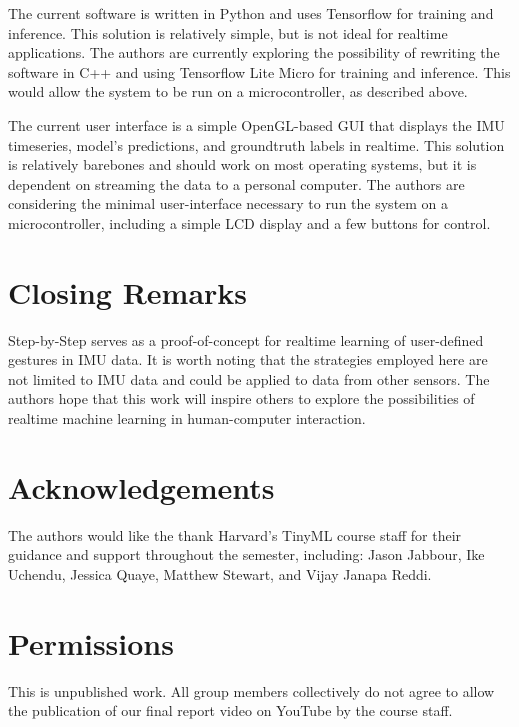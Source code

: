 \documentclass{article}
\begin{document}
The current software is written in Python and uses Tensorflow for training and inference. This solution is relatively simple, but is not ideal for realtime applications. The authors are currently exploring the possibility of rewriting the software in C++ and using Tensorflow Lite Micro for training and inference. This would allow the system to be run on a microcontroller, as described above.

The current user interface is a simple OpenGL-based GUI that displays the IMU timeseries, model's predictions, and groundtruth labels in realtime. This solution is relatively barebones and should work on most operating systems, but it is dependent on streaming the data to a personal computer. The authors are considering the minimal user-interface necessary to run the system on a microcontroller, including a simple LCD display and a few buttons for control.


\section{Closing Remarks}
Step-by-Step serves as a proof-of-concept for realtime learning of user-defined gestures in IMU data. It is worth noting that the strategies employed here are not limited to IMU data and could be applied to data from other sensors. The authors hope that this work will inspire others to explore the possibilities of realtime machine learning in human-computer interaction.

\section{Acknowledgements}
The authors would like the thank Harvard's TinyML course staff for their guidance and support throughout the semester, including: Jason Jabbour, Ike Uchendu, Jessica Quaye, Matthew Stewart, and Vijay Janapa Reddi.

\section{Permissions}
This is unpublished work. All group members collectively do not agree to allow the publication of our final report video on YouTube by the course staff.


% 
% 
\end{document}
